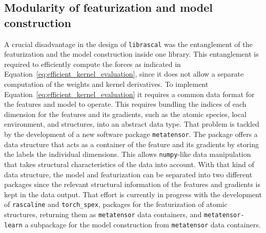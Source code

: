 \subsection{Modularity of featurization and model construction}
A crucial disadvantage in the design of \texttt{librascal} was the entanglement of the featurization and the model construction inside one library.
This entanglement is required to efficiently compute the forces as indicated in Equation~\eqref{eq:efficient_kernel_evaluation}, since it does not allow a separate computation of the weights and kernel derivatives.
To implement Equation~\eqref{eq:efficient_kernel_evaluation} it requires a common data format for the features and model to operate.
This requires bundling the indices of each dimension for the features and its gradients, such as the atomic species, local environment, and structures, into an abstract data type.
That problem is tackled by the development of a new software package \texttt{metatensor}.
The package offers a data structure that acts as a container of the feature and its gradients by storing the labels the individual dimensions.
This allows \texttt{numpy}-like data manipulation that takes structural characteristics of the data into account.
With that kind of data structure, the model and featurization can be separated into two different packages since the relevant structural information of the features and gradients is kept in the data output.
That effort is currently in progress with the development of \texttt{rascaline} and \texttt{torch\_spex}, packages for the featurization of atomic structures, returning them as \texttt{metatensor} data containers, and \texttt{metatensor-learn} a subpackage for the model construction from \texttt{metatensor} data containers.


